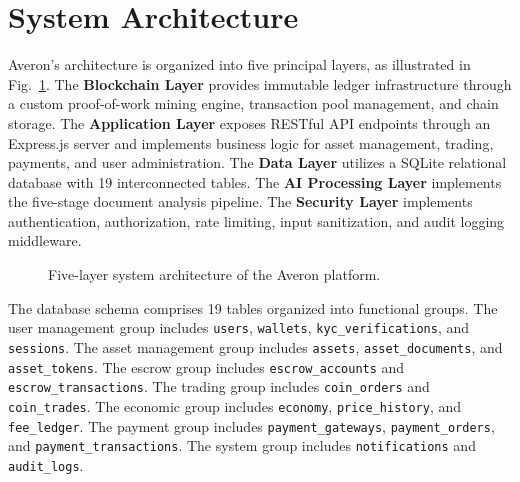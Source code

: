 \documentclass[conference]{IEEEtran}
\begin{document}
\section{System Architecture}
\label{sec:architecture}

Averon's architecture is organized into five principal layers, as illustrated in Fig.~\ref{fig:architecture}. The \textbf{Blockchain Layer} provides immutable ledger infrastructure through a custom proof-of-work mining engine, transaction pool management, and chain storage. The \textbf{Application Layer} exposes RESTful API endpoints through an Express.js server and implements business logic for asset management, trading, payments, and user administration. The \textbf{Data Layer} utilizes a SQLite relational database with 19 interconnected tables. The \textbf{AI Processing Layer} implements the five-stage document analysis pipeline. The \textbf{Security Layer} implements authentication, authorization, rate limiting, input sanitization, and audit logging middleware.

\begin{figure}[t]
\centering
{}
\caption{Five-layer system architecture of the Averon platform.}
\label{fig:architecture}
\end{figure}

The database schema comprises 19 tables organized into functional groups. The user management group includes \texttt{users}, \texttt{wallets}, \texttt{kyc\_verifications}, and \texttt{sessions}. The asset management group includes \texttt{assets}, \texttt{asset\_documents}, and \texttt{asset\_tokens}. The escrow group includes \texttt{escrow\_accounts} and \texttt{escrow\_transactions}. The trading group includes \texttt{coin\_orders} and \texttt{coin\_trades}. The economic group includes \texttt{economy}, \texttt{price\_history}, and \texttt{fee\_ledger}. The payment group includes \texttt{payment\_gateways}, \texttt{payment\_orders}, and \texttt{payment\_transactions}. The system group includes \texttt{notifications} and \texttt{audit\_logs}.
\end{document}
